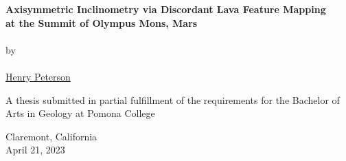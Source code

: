 \begin{titlepage}
    \begin{center}

        \phantom{.}

        \vfill
 
        \large\textbf{Axisymmetric Inclinometry via Discordant Lava Feature Mapping \\ at the Summit of Olympus Mons, Mars}
        \\~\\
        by
        \\~\\
        \href{mailto:hgpa2018@mymail.pomona.edu}{Henry Peterson}

        \vfill
        \vfill
        \vfill

        A thesis submitted in partial fulfillment of the requirements for the Bachelor of Arts in Geology at Pomona College

             
        \vfill
        \vfill
        \vfill

        Claremont, California\\
        April 21, 2023

    \end{center}
 \end{titlepage}